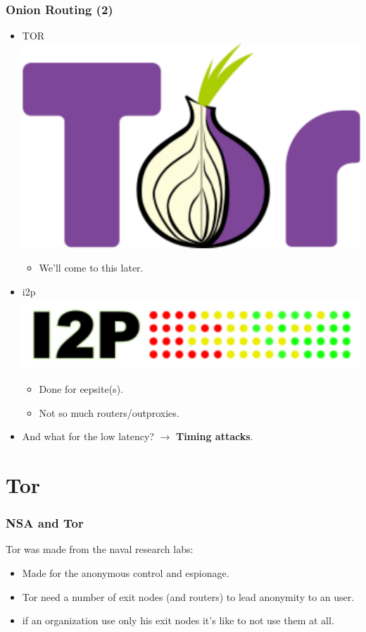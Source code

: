 \begin{frame}
	\frametitle{Onion Routing (2)}

	\begin{itemize}
		\item TOR \includegraphics[scale=0.1]{imgs/Tor_logo}
		\begin{itemize}
			\item We'll come to this later.
		\end{itemize}
		\item i2p \includegraphics[scale=0.2]{imgs/I2P_logo}
		\begin{itemize}
			\item Done for eepsite(s).
			\item Not so much routers/outproxies.
		\end{itemize}
	\end{itemize}
	\begin{itemize}
		\item And what for the low latency? $\to$ \textbf{Timing attacks}.
	\end{itemize}
\end{frame}

\section{Tor}
\begin{frame}
	\frametitle{NSA and Tor}
	Tor was made from the naval research labs:
	\begin{itemize}
		\item Made for the anonymous control and espionage.
		\item Tor need a number of exit nodes (and routers) to lead
		anonymity to an user.
		\item if an organization use only his exit nodes it's like to
		not use them at all.
	\end{itemize}
\end{frame}

